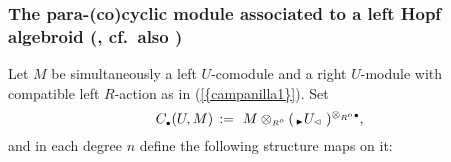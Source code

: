 \documentclass[reqno, a4paper, 10pt]{amsart}
\numberwithin{equation}{section}
\theoremstyle{plain}
\theoremstyle{definition}
\theoremstyle{remark}
\begin{document}
\subsubsection{The para-(co)cyclic module associated to a left Hopf algebroid 
{\rm (\cite{KowKra:CSIACT}, cf.~also \cite{KowPos:TCTOHA})}}\label{ssubsect:CUM}

Let $M$ be simultaneously a left $U$-comodule and a right $U$-module with compatible left $R$-action as in {{\rm (}\ref{{campanilla1}}{\rm )}}.
Set
$$
C_{{\scriptscriptstyle{\bullet}}}(U,M) \, := \,\,M \otimes_{{\scriptscriptstyle{{R^{o}}}}}  ({{}_{{{{\,\raise1pt\hbox{$\scriptscriptstyle{\blacktriangleright}$} \, }} \!}} {U}_{{\! {{\,\raise1pt\hbox{$\scriptscriptstyle{\lhd}$} \, }}}}\,})^{\otimes_{{\scriptscriptstyle{{R^{o}}}}}  {{\scriptscriptstyle{\bullet}}}},
$$
and in each degree $n$ define the following structure maps on it:
\!\!\!\!
\end{document}
